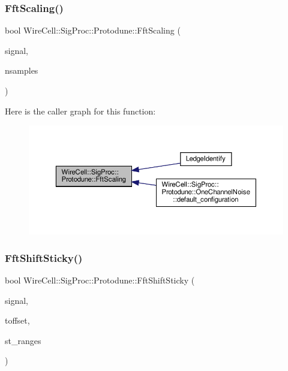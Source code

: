 \subsubsection{\texorpdfstring{Fft\+Scaling()}{FftScaling()}}
{\footnotesize\ttfamily bool Wire\+Cell\+::\+Sig\+Proc\+::\+Protodune\+::\+Fft\+Scaling (\begin{DoxyParamCaption}\item[{\hyperlink{namespace_wire_cell_1_1_waveform_a479175e541c8545e87cd8063b74b6956}{Wire\+Cell\+::\+Waveform\+::realseq\+\_\+t} \&}]{signal,  }\item[{int}]{nsamples }\end{DoxyParamCaption})}

Here is the caller graph for this function\+:
\nopagebreak
\begin{figure}[H]
\begin{center}
\leavevmode
\includegraphics[width=350pt]{namespace_wire_cell_1_1_sig_proc_1_1_protodune_a70a419137440aaee4a7afd4366c10404_icgraph}
\end{center}
\end{figure}
\mbox{\label{namespace_wire_cell_1_1_sig_proc_1_1_protodune_a4a864612af01dc605e073a79fc261940}} 
\subsubsection{\texorpdfstring{Fft\+Shift\+Sticky()}{FftShiftSticky()}}
{\footnotesize\ttfamily bool Wire\+Cell\+::\+Sig\+Proc\+::\+Protodune\+::\+Fft\+Shift\+Sticky (\begin{DoxyParamCaption}\item[{\hyperlink{namespace_wire_cell_1_1_waveform_a479175e541c8545e87cd8063b74b6956}{Wire\+Cell\+::\+Waveform\+::realseq\+\_\+t} \&}]{signal,  }\item[{double}]{toffset,  }\item[{std\+::vector$<$ std\+::pair$<$ int, int $>$ $>$ \&}]{st\+\_\+ranges }\end{DoxyParamCaption})}

